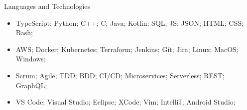 \documentclass[]{mussocv}
\begin{document}
	\begin{cvsection}{Languages and Technologies}
		\begin{cvsubsection}{}{}{}	
			\begin{itemize}
				\item TypeScript; Python; C++; C; Java; Kotlin; SQL; JS; JSON; HTML; CSS; Bash;
				\item AWS; Docker; Kubernetes; Terraform; Jenkins; Git; Jira; Linux; MacOS; Windows;
				\item Scrum; Agile; TDD; BDD; CI/CD; Microservices; Serverless; REST; GraphQL;
				\item VS Code; Visual Studio; Eclipse; XCode; Vim; IntelliJ; Android Studio;
			\end{itemize}
		\end{cvsubsection}
	\end{cvsection}
	
\end{document}
